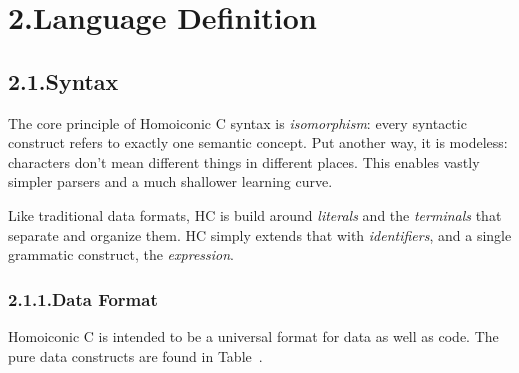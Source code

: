 \documentclass[preprint]{{sigplanconf}}
\begin{document}
\section{2.\hspace*{0.5em}Language Definition}\label{sec-language-definition}%

\subsection{2.1.\hspace*{0.5em}Syntax}\label{sec-syntax}%

\noindent The core principle of Homoiconic C syntax is \emph{isomorphism}: every
syntactic construct refers to exactly one semantic concept. Put another
way, it is modeless: characters don't mean different things in different
places. This enables vastly simpler parsers and a much shallower learning
curve.%

Like traditional data formats, HC is build around \emph{literals} and
the \emph{terminals} that separate and organize them. HC simply extends that
with \emph{identifiers}, and a single grammatic construct, the \emph{expression}.%

\subsubsection{2.1.1.\hspace*{0.5em}Data Format}\label{sec-data-format}%

\noindent Homoiconic C is intended to be a universal format for data as well as code.
The pure data constructs are found in Table~.%
\end{document}

